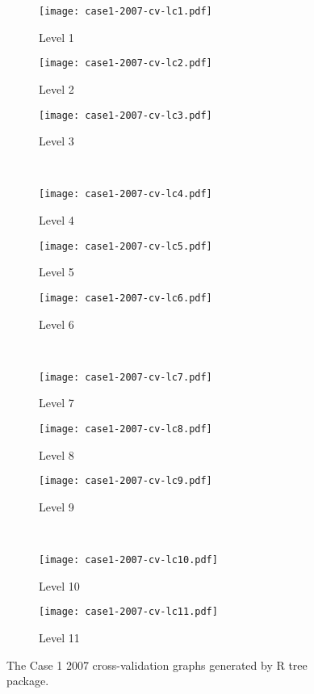 \begin{appendices}
\begin{figure}[!ht] \centering
	\captionsetup[subfigure]{width=2.0in}
	\begin{subfigure}[t]{0.32\textwidth}
		\texttt{[image: case1-2007-cv-lc1.pdf]}
		\caption{Level 1}
	\end{subfigure}
	\begin{subfigure}[t]{0.32\textwidth}
		\texttt{[image: case1-2007-cv-lc2.pdf]}
		\caption{Level 2}
	\end{subfigure}
	\begin{subfigure}[t]{0.32\textwidth}
		\texttt{[image: case1-2007-cv-lc3.pdf]}
		\caption{Level 3}
	\end{subfigure}\\
	\vspace{5pt}
	\begin{subfigure}[t]{0.32\textwidth}
		\texttt{[image: case1-2007-cv-lc4.pdf]}
		\caption{Level 4}
	\end{subfigure}
	\begin{subfigure}[t]{0.32\textwidth}
		\texttt{[image: case1-2007-cv-lc5.pdf]}
		\caption{Level 5}
	\end{subfigure}
	\begin{subfigure}[t]{0.32\textwidth}
		\texttt{[image: case1-2007-cv-lc6.pdf]}
		\caption{Level 6}
	\end{subfigure}\\
	\vspace{5pt}	
	\begin{subfigure}[t]{0.32\textwidth}
		\texttt{[image: case1-2007-cv-lc7.pdf]}
		\caption{Level 7}
	\end{subfigure}
	\begin{subfigure}[t]{0.32\textwidth}
		\texttt{[image: case1-2007-cv-lc8.pdf]}
		\caption{Level 8}
	\end{subfigure}
	\begin{subfigure}[t]{0.32\textwidth}
		\texttt{[image: case1-2007-cv-lc9.pdf]}
		\caption{Level 9}
	\end{subfigure}\\
	\vspace{5pt}
	\begin{subfigure}[t]{0.32\textwidth}
		\texttt{[image: case1-2007-cv-lc10.pdf]}
		\caption{Level 10}
	\end{subfigure}
	\begin{subfigure}[t]{0.32\textwidth}
		\texttt{[image: case1-2007-cv-lc11.pdf]}
		\caption{Level 11}
	\end{subfigure}
	\vspace{5pt}
	\caption[The Case 1 2007 cross-validation graphs generated by R tree package.]{The Case 1 2007 cross-validation graphs generated by R tree package.}
	\label{fig: appendix-fig.c2.cv}
\end{figure}


\end{appendices}
